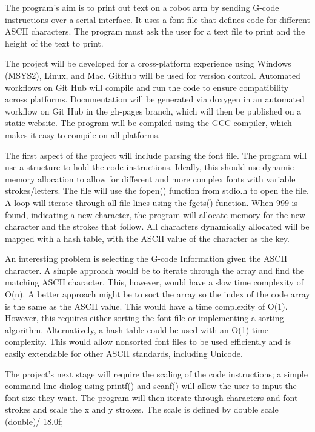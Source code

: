 The program's aim is to print out text on a robot arm by sending G-code instructions over a serial interface. It uses a font file that defines code for different ASCII characters. The program must ask the user for a text file to print and the height of the text to print.

The project will be developed for a cross-platform experience using Windows (MSYS2), Linux, and Mac. GitHub will be used for version control. Automated workflows on Git Hub will compile and run the code to ensure compatibility across platforms. Documentation will be generated via doxygen in an automated workflow on Git Hub in the gh-pages branch, which will then be published on a static website. The program will be compiled using the GCC compiler, which makes it easy to compile on all platforms. 

The first aspect of the project will include parsing the font file. The program will use a structure to hold the code instructions. Ideally, this should use dynamic memory allocation to allow for different and more complex fonts with variable strokes/letters. The file will use the fopen() function from stdio.h to open the file. A loop will iterate through all file lines using the fgets() function. When 999 is found, indicating a new character, the program will allocate memory for the new character and the strokes that follow. All characters dynamically allocated will be mapped with a hash table, with the ASCII value of the character as the key.

An interesting problem is selecting the G-code Information given the ASCII character. A simple approach would be to iterate through the array and find the matching ASCII character. This, however, would have a slow time complexity of O(n). A better approach might be to sort the array so the index of the code array is the same as the ASCII value. This would have a time complexity of O(1). However, this requires either sorting the font file or implementing a sorting algorithm. Alternatively, a hash table could be used with an O(1) time complexity. This would allow nonsorted font files to be used efficiently and is easily extendable for other ASCII standards, including Unicode. 

The project's next stage will require the scaling of the code instructions; a simple command line dialog using printf() and scanf() will allow the user to input the font size they want. The program will then iterate through characters and font strokes and scale the x and y strokes. The scale is defined by double scale = (double)/ 18.0f; 

